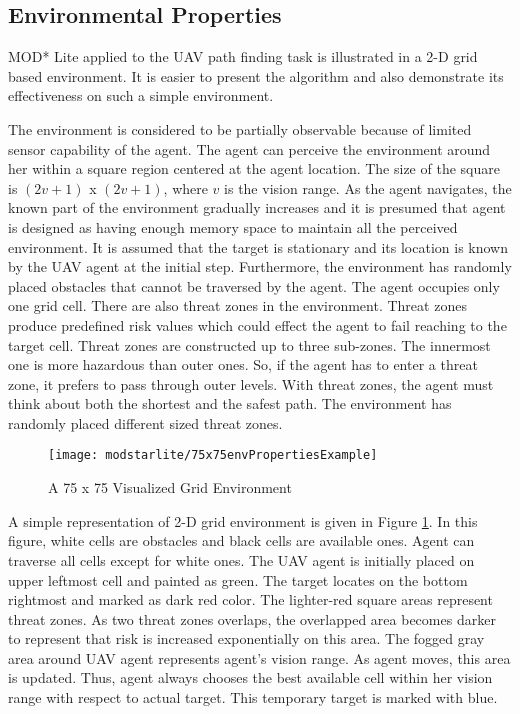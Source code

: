 \subsection{Environmental Properties}
\label{envProperties}
MOD* Lite applied to the UAV path finding task is illustrated in a 2-D grid based environment. It is easier to present the algorithm and also demonstrate its effectiveness on such a simple environment.

The environment is considered to be partially observable because of limited sensor capability of the agent. The agent can perceive the environment around her within a square region centered at the agent location. The size of the square is $(2v + 1)$ x $(2v + 1)$, where $v$ is the vision range. As the agent navigates, the known part of the environment gradually increases and it is presumed that agent is designed as having enough memory space to maintain all the perceived environment. It is assumed that the target is stationary and its location is known by the UAV agent at the initial step. Furthermore, the environment has randomly placed obstacles that cannot be traversed by the agent. The agent occupies only one grid cell. There are also threat zones in the environment. Threat zones produce predefined risk values which could effect the agent to fail reaching to the target cell. Threat zones are constructed up to three sub-zones. The innermost one is more hazardous than outer ones. So, if the agent has to enter a threat zone, it prefers to pass through outer levels. With threat zones, the agent must think about both the shortest and the safest path. The environment has randomly placed different sized threat zones.

\begin{figure}
\centering
\texttt{[image: modstarlite/75x75envPropertiesExample]}
\caption{A 75 x 75 Visualized Grid Environment}
\label{fig:75x75envExample}
\end{figure}

A simple representation of 2-D grid environment is given in Figure \ref{fig:75x75envExample}. In this figure, white cells are obstacles and black cells are available ones. Agent can traverse all cells except for white ones. The UAV agent is initially placed on upper leftmost cell and painted as green. The target locates on the bottom rightmost and marked as dark red color. The lighter-red square areas represent threat zones. As two threat zones overlaps, the overlapped area becomes darker to represent that risk is increased exponentially on this area. The fogged gray area around UAV agent represents agent's vision range. As agent moves, this area is updated. Thus, agent always chooses the best available cell within her vision range with respect to actual target. This temporary target is marked with blue.

